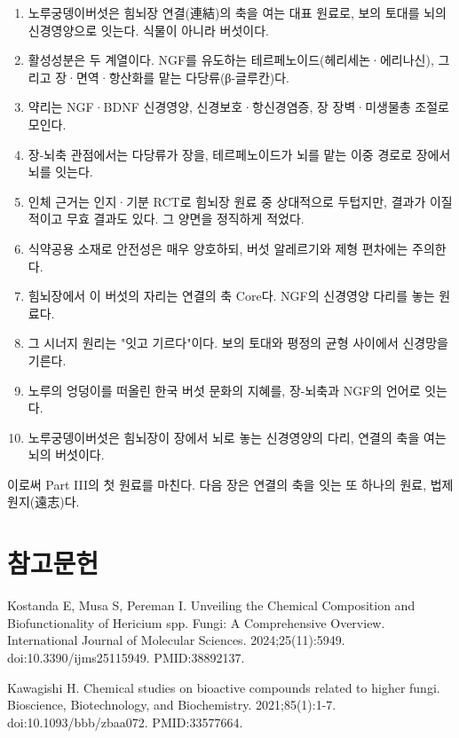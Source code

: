 \documentclass[12pt,oneside]{book}
\newcommand{\refstart}{\par\begingroup\fontsize{8.5pt}{10.2pt}\selectfont\setlength{\parskip}{1.4pt}\raggedright}
\newcommand{\reff}[2]{\par\hangindent=7mm\hangafter=1\noindent[#1]\hspace{2mm}#2\par}
\begin{document}
\begin{enumerate}[leftmargin=6mm,itemsep=1pt,topsep=2pt]
  \item 노루궁뎅이버섯은 힘뇌장 연결(連結)의 축을 여는 대표 원료로, 보의 토대를 뇌의 신경영양으로 잇는다. 식물이 아니라 버섯이다.
  \item 활성성분은 두 계열이다. NGF를 유도하는 테르페노이드(헤리세논·에리나신), 그리고 장·면역·항산화를 맡는 다당류(β-글루칸)다.
  \item 약리는 NGF·BDNF 신경영양, 신경보호·항신경염증, 장 장벽·미생물총 조절로 모인다.
  \item 장-뇌축 관점에서는 다당류가 장을, 테르페노이드가 뇌를 맡는 이중 경로로 장에서 뇌를 잇는다.
  \item 인체 근거는 인지·기분 RCT로 힘뇌장 원료 중 상대적으로 두텁지만, 결과가 이질적이고 무효 결과도 있다. 그 양면을 정직하게 적었다.
  \item 식약공용 소재로 안전성은 매우 양호하되, 버섯 알레르기와 제형 편차에는 주의한다.
  \item 힘뇌장에서 이 버섯의 자리는 연결의 축 Core다. NGF의 신경영양 다리를 놓는 원료다.
  \item 그 시너지 원리는 "잇고 기르다"이다. 보의 토대와 평정의 균형 사이에서 신경망을 기른다.
  \item 노루의 엉덩이를 떠올린 한국 버섯 문화의 지혜를, 장-뇌축과 NGF의 언어로 잇는다.
  \item 노루궁뎅이버섯은 힘뇌장이 장에서 뇌로 놓는 신경영양의 다리, 연결의 축을 여는 뇌의 버섯이다.
\end{enumerate}

이로써 Part III의 첫 원료를 마친다. 다음 장은 연결의 축을 잇는 또 하나의 원료, 법제 원지(遠志)다.

\section*{참고문헌}

\refstart

\reff{1}{Kostanda E, Musa S, Pereman I. Unveiling the Chemical Composition and Biofunctionality of Hericium spp. Fungi: A Comprehensive Overview. International Journal of Molecular Sciences. 2024;25(11):5949. doi:10.3390/ijms25115949. PMID:38892137.}

\reff{2}{Kawagishi H. Chemical studies on bioactive compounds related to higher fungi. Bioscience, Biotechnology, and Biochemistry. 2021;85(1):1-7. doi:10.1093/bbb/zbaa072. PMID:33577664.}
\end{document}
